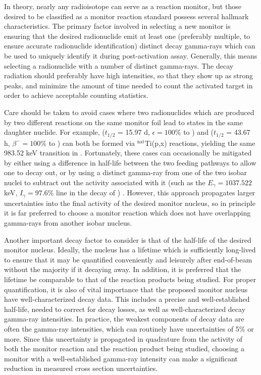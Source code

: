 In theory, nearly any radioisotope can serve as a reaction monitor, but those desired to be classified as a monitor reaction standard possess several hallmark characteristics.
The primary factor involved in selecting a new monitor is ensuring that the desired radionuclide emit  at least one (preferably multiple, to ensure accurate radionuclide identification) distinct decay gamma-rays which can be used to uniquely identify it during post-activation assay.  
Generally, this means selecting a radionuclide with a number of distinct gamma-rays.
The decay radiation should preferably have high intensities, so that they show up as strong peaks, and minimize the amount of time needed to count the activated target in order to achieve acceptable counting statistics. 


Care should be taken to avoid cases where two radionuclides which are produced by two different reactions on the same monitor foil lead to states in the same daughter nuclide.  
For example,   ($t_{1/2}$ = 15.97 d, $\epsilon=100\%$ to ) and   ($t_{1/2}$ = 43.67 h, $\beta^-=100\%$ to ) can both be formed via $^\text{nat}$Ti(p,x) reactions, yielding the same 983.52 keV transition in  \cite{Burrows2006}.
Fortunately, these cases can occasionally be mitigated by either using a difference in half-life between the two feeding pathways to allow one to decay out, or by using a distinct gamma-ray from one of the two isobar nuclei to subtract out the activity associated with it (such as the $E_\gamma=1037.522$ keV, $I_\gamma=97.6\%$ line in the decay of ) \cite{Burrows2006}.
However, this approach propagates larger uncertainties into the final activity of the desired monitor nucleus, so in principle it is far preferred to choose a monitor reaction which does not have overlapping gamma-rays from another isobar nucleus.

Another important decay factor to consider is that of the half-life of the desired monitor nucleus.
Ideally, the nucleus has a lifetime which is sufficiently long-lived to ensure that it may be quantified  conveniently and leisurely after end-of-beam without the majority if it decaying away.
In addition, it is preferred that the lifetime be comparable to that of the reaction products being studied. 
For proper quantification, it is also of vital importance that the proposed monitor nucleus have well-characterized decay data.
This includes a precise and well-established half-life,  needed to  correct for decay losses, as well as well-characterized decay gamma-ray intensities.
In practice, the weakest components of decay data are often the gamma-ray intensities, which can routinely have uncertainties of 5\% or more.
Since this uncertainty is propagated in quadrature from the activity of both the monitor reaction and the reaction product being studied, choosing a monitor with a well-established gamma-ray intensity can make a significant reduction in measured cross section uncertainties.


